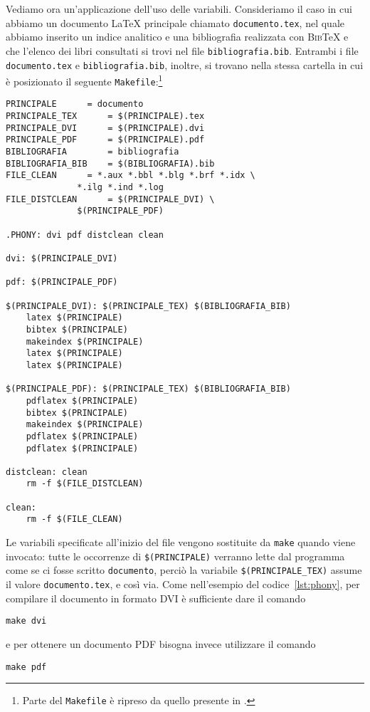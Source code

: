 Vediamo ora un'applicazione dell'uso delle variabili.  Consideriamo il caso in
cui abbiamo un documento \LaTeX{}
principale chiamato \verb|documento.tex|, nel quale abbiamo inserito un indice
analitico e una bibliografia realizzata con \textsc{Bib}\TeX{}
e che l'elenco dei libri consultati si trovi nel file \verb|bibliografia.bib|.
Entrambi i file \verb|documento.tex| e \verb|bibliografia.bib|, inoltre, si
trovano nella stessa cartella in cui è posizionato il seguente
\verb|Makefile|:\footnote{Parte del \texttt{Makefile} è ripreso da quello
  presente in \textcite[61]{caucci:tabelle}.}
\begin{lstlisting}[caption={Esempio di \texttt{Makefile} che utilizza le
variabili.},label=lst:variabili]
PRINCIPALE 		= documento
PRINCIPALE_TEX		= $(PRINCIPALE).tex
PRINCIPALE_DVI		= $(PRINCIPALE).dvi
PRINCIPALE_PDF		= $(PRINCIPALE).pdf
BIBLIOGRAFIA		= bibliografia
BIBLIOGRAFIA_BIB	= $(BIBLIOGRAFIA).bib
FILE_CLEAN		= *.aux *.bbl *.blg *.brf *.idx \
			  *.ilg *.ind *.log
FILE_DISTCLEAN		= $(PRINCIPALE_DVI) \
			  $(PRINCIPALE_PDF)

.PHONY: dvi pdf distclean clean

dvi: $(PRINCIPALE_DVI)

pdf: $(PRINCIPALE_PDF)

$(PRINCIPALE_DVI): $(PRINCIPALE_TEX) $(BIBLIOGRAFIA_BIB)
	latex $(PRINCIPALE)
	bibtex $(PRINCIPALE)
	makeindex $(PRINCIPALE)
	latex $(PRINCIPALE)
	latex $(PRINCIPALE)

$(PRINCIPALE_PDF): $(PRINCIPALE_TEX) $(BIBLIOGRAFIA_BIB)
	pdflatex $(PRINCIPALE)
	bibtex $(PRINCIPALE)
	makeindex $(PRINCIPALE)
	pdflatex $(PRINCIPALE)
	pdflatex $(PRINCIPALE)

distclean: clean
	rm -f $(FILE_DISTCLEAN)

clean:
	rm -f $(FILE_CLEAN)
\end{lstlisting}
Le variabili specificate all'inizio del file vengono sostituite da \verb|make|
quando viene invocato: tutte le occorrenze di
\verb|$(PRINCIPALE)| verranno lette dal programma come se ci fosse scritto
\verb|documento|, perciò la variabile \verb|$(PRINCIPALE_TEX)|
assume il valore \verb|documento.tex|, e così via. Come nell'esempio del
codice~\ref{lst:phony}, per compilare il documento in formato \textsc{DVI} è
sufficiente dare il comando
\begin{verbatim}
make dvi
\end{verbatim}
e per ottenere un documento \textsc{PDF} bisogna invece utilizzare il comando
\begin{verbatim}
make pdf
\end{verbatim}

